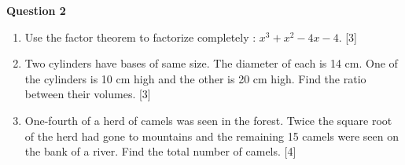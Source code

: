 \par
\noindent
\textbf{Question 2}\\
\begin{enumerate}[label=(\roman*)]

    \item Use the factor theorem to factorize completely : 
        $x^3 + x^2 - 4x - 4$. \hfill [3]

    \item Two cylinders have bases of same size. The diameter of each is 14 cm. 
        One of the cylinders is 10 cm high and the other is 20 cm high. Find 
        the ratio between their volumes. \hfill [3]

    \item One-fourth of a herd of camels was seen in the forest. Twice the 
        square root of the herd had gone to mountains and the remaining 15 camels 
        were seen on the bank of a river. Find the total number of camels. \hfill [4]

\end{enumerate}

